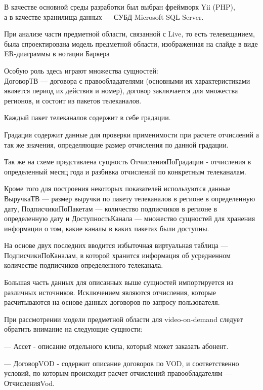 \documentclass[a4paper]{article}
\begin{document}
В качестве основной среды разработки был выбран фреймворк Yii (PHP),\\
а в качестве хранилища данных --- СУБД Microsoft SQL Server.\\

\newpage

При анализе части предметной области, связанной с Live, то есть телевещанием, была спроектирована модель предметной области, изображенная на слайде в виде
ER-диаграммы в нотации Баркера

Особую роль здесь играют множества сущностей:\\

ДоговорТВ --- договора с правообладателями (основными их характеристиками является период их действия и номер), договор заключается  
для множества регионов, и состоит из пакетов телеканалов.

Каждый пакет телеканалов содержит в себе градации.

Градация содержит данные для проверки применимости при расчете отчислений а так же значения, определяющие размер отчисления по данной градации.

Так же на схеме представлена сущность ОтчисленияПоГрадации - отчисления в определенный месяц года и разбивка отчислений по конкретным телеканалам.

\newpage

Кроме того для построения некоторых показателей используются данные ВыручкаТВ --- размер выручки по пакету телеканалов в регионе в определенную дату, ПодписчикиПоПакетам --- количество подписчиков в регионе в определенную дату и ДоступностьКанала
 --- множество сущностей для хранения информации о том, какие каналы в каких пакетах были доступны.

На основе двух последних вводится избыточная виртуальная таблица --- ПодписчикиПоКаналам, 
в которой хранится информация об усредненном количестве подписчиков определенного телеканала.

Большая часть данных для описанных выше сущностей импортируется из различных источников.
Исключением являются отчисления, которые расчитываются на основе данных договоров по запросу пользователя.

\newpage

При рассмотрении модели предметной области для video-on-demand следует обратить внимание на следующие сущности:

--- Ассет - описание отдельного клипа, который может заказать абонент.

--- ДоговорVOD - содержит описание договоров по VOD, и соответственно условий, по которым происходит 
расчет отчислений правообладателям --- ОтчисленияVod.
\end{document}
